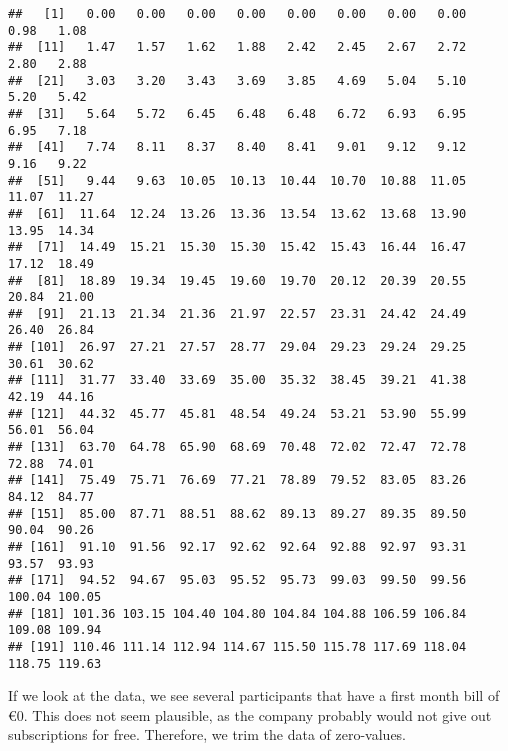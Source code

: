 \documentclass[
]{article}
\newenvironment{Shaded}{\begin{snugshade}}{\end{snugshade}}
\newcommand{\AttributeTok}[1]{\textcolor[rgb]{0.77,0.63,0.00}{#1}}
\newcommand{\CommentTok}[1]{\textcolor[rgb]{0.56,0.35,0.01}{\textit{#1}}}
\newcommand{\ControlFlowTok}[1]{\textcolor[rgb]{0.13,0.29,0.53}{\textbf{#1}}}
\newcommand{\DecValTok}[1]{\textcolor[rgb]{0.00,0.00,0.81}{#1}}
\newcommand{\FunctionTok}[1]{\textcolor[rgb]{0.00,0.00,0.00}{#1}}
\newcommand{\NormalTok}[1]{#1}
\newcommand{\OtherTok}[1]{\textcolor[rgb]{0.56,0.35,0.01}{#1}}
\newcommand{\SpecialCharTok}[1]{\textcolor[rgb]{0.00,0.00,0.00}{#1}}
\newcommand{\StringTok}[1]{\textcolor[rgb]{0.31,0.60,0.02}{#1}}
\begin{document}
\begin{verbatim}
##   [1]   0.00   0.00   0.00   0.00   0.00   0.00   0.00   0.00   0.98   1.08
##  [11]   1.47   1.57   1.62   1.88   2.42   2.45   2.67   2.72   2.80   2.88
##  [21]   3.03   3.20   3.43   3.69   3.85   4.69   5.04   5.10   5.20   5.42
##  [31]   5.64   5.72   6.45   6.48   6.48   6.72   6.93   6.95   6.95   7.18
##  [41]   7.74   8.11   8.37   8.40   8.41   9.01   9.12   9.12   9.16   9.22
##  [51]   9.44   9.63  10.05  10.13  10.44  10.70  10.88  11.05  11.07  11.27
##  [61]  11.64  12.24  13.26  13.36  13.54  13.62  13.68  13.90  13.95  14.34
##  [71]  14.49  15.21  15.30  15.30  15.42  15.43  16.44  16.47  17.12  18.49
##  [81]  18.89  19.34  19.45  19.60  19.70  20.12  20.39  20.55  20.84  21.00
##  [91]  21.13  21.34  21.36  21.97  22.57  23.31  24.42  24.49  26.40  26.84
## [101]  26.97  27.21  27.57  28.77  29.04  29.23  29.24  29.25  30.61  30.62
## [111]  31.77  33.40  33.69  35.00  35.32  38.45  39.21  41.38  42.19  44.16
## [121]  44.32  45.77  45.81  48.54  49.24  53.21  53.90  55.99  56.01  56.04
## [131]  63.70  64.78  65.90  68.69  70.48  72.02  72.47  72.78  72.88  74.01
## [141]  75.49  75.71  76.69  77.21  78.89  79.52  83.05  83.26  84.12  84.77
## [151]  85.00  87.71  88.51  88.62  89.13  89.27  89.35  89.50  90.04  90.26
## [161]  91.10  91.56  92.17  92.62  92.64  92.88  92.97  93.31  93.57  93.93
## [171]  94.52  94.67  95.03  95.52  95.73  99.03  99.50  99.56 100.04 100.05
## [181] 101.36 103.15 104.40 104.80 104.84 104.88 106.59 106.84 109.08 109.94
## [191] 110.46 111.14 112.94 114.67 115.50 115.78 117.69 118.04 118.75 119.63
\end{verbatim}

If we look at the data, we see several participants that have a first
month bill of €0. This does not seem plausible, as the company probably
would not give out subscriptions for free. Therefore, we trim the data
of zero-values.

\begin{Shaded}
\end{Shaded}
\end{document}
